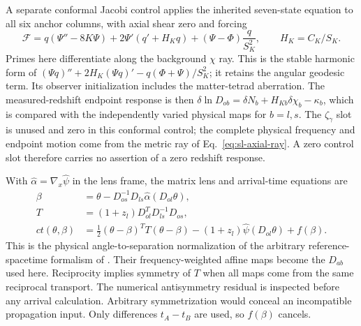 A separate conformal Jacobi control applies the inherited seven-state
equation to all six anchor columns, with axial shear zero and forcing
\begin{equation}
 \mathcal F=q(\Psi''-8K\Psi)
 +2\Psi'(q'+H_Kq)+(\Psi-\Phi)\frac{q}{S_K^2},
 \qquad H_K=C_K/S_K.
 \label{eq:sl-seven-control}
\end{equation}
Primes here differentiate along the background $\chi$ ray. This is the
stable harmonic form of
$(\Psi q)''+2H_K(\Psi q)'-q(\Phi+\Psi)/S_K^2$; it retains the angular
geodesic term. Its observer initialization includes the matter-tetrad
aberration. The measured-redshift endpoint response is then
$\delta\ln D_{ob}=\delta N_b+H_{Kb}\delta\chi_b-\kappa_b$, which is
compared with the independently varied physical maps for $b=l,s$.
The $\zeta_\gamma$ slot is unused and zero in this conformal control;
the complete physical frequency and endpoint motion come from the metric
ray of Eq.~\eqref{eq:sl-axial-ray}. A zero control slot therefore carries
no assertion of a zero redshift response.

With $\hat\alpha=\nabla_x\hat\psi$ in the lens frame, the matrix lens and
arrival-time equations are
\begin{align}
 \beta&=\theta-D_{os}^{-1}D_{ls}\hat\alpha(D_{ol}\theta),
 \label{eq:sl-lens}\\
 T&=(1+z_l)D_{ol}^TD_{ls}^{-1}D_{os},
 \label{eq:sl-T}\\
 ct(\theta,\beta)&=\frac12(\theta-\beta)^TT(\theta-\beta)
 -(1+z_l)\hat\psi(D_{ol}\theta)+f(\beta).
 \label{eq:sl-arrival}
\end{align}
This is the physical angle-to-separation normalization of the arbitrary
reference-spacetime formalism of
\citet[Eqs.~(2), (3), (11)--(14)]{Fleury2021arbitrary}.
Their frequency-weighted affine maps become the $D_{ab}$ used here.
Reciprocity implies symmetry of $T$ when all maps come from the same
reciprocal transport. The numerical antisymmetry residual is inspected
before any arrival calculation. Arbitrary symmetrization would conceal an
incompatible propagation input. Only differences $t_A-t_B$ are used, so
$f(\beta)$ cancels.

